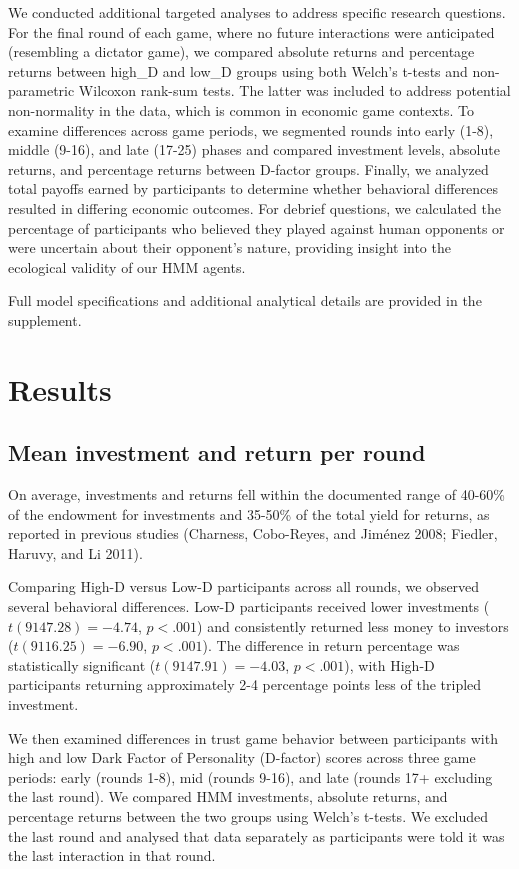\documentclass[
]{article}
\begin{document}
We conducted additional targeted analyses to address specific research questions. For the final round of each game, where no future interactions were anticipated (resembling a dictator game), we compared absolute returns and percentage returns between high\_D and low\_D groups using both Welch's t-tests and non-parametric Wilcoxon rank-sum tests. The latter was included to address potential non-normality in the data, which is common in economic game contexts. To examine differences across game periods, we segmented rounds into early (1-8), middle (9-16), and late (17-25) phases and compared investment levels, absolute returns, and percentage returns between D-factor groups. Finally, we analyzed total payoffs earned by participants to determine whether behavioral differences resulted in differing economic outcomes. For debrief questions, we calculated the percentage of participants who believed they played against human opponents or were uncertain about their opponent's nature, providing insight into the ecological validity of our HMM agents.

Full model specifications and additional analytical details are provided in the supplement.

\section{Results}\label{results}

\subsection{Mean investment and return per round}\label{mean-investment-and-return-per-round}

On average, investments and returns fell within the documented range of 40-60\% of the endowment for investments and 35-50\% of the total yield for returns, as reported in previous studies (Charness, Cobo-Reyes, and Jiménez 2008; Fiedler, Haruvy, and Li 2011).

Comparing High-D versus Low-D participants across all rounds, we observed several behavioral differences. Low-D participants received lower investments (\(t(9147.28) = -4.74\), \(p < .001\)) and consistently returned less money to investors (\(t(9116.25) = -6.90\), \(p < .001\)). The difference in return percentage was statistically significant (\(t(9147.91) = -4.03\), \(p < .001\)), with High-D participants returning approximately 2-4 percentage points less of the tripled investment.

We then examined differences in trust game behavior between participants with high and low Dark Factor of Personality (D-factor) scores across three game periods: early (rounds 1-8), mid (rounds 9-16), and late (rounds 17+ excluding the last round). We compared HMM investments, absolute returns, and percentage returns between the two groups using Welch's t-tests. We excluded the last round and analysed that data separately as participants were told it was the last interaction in that round.
\end{document}
